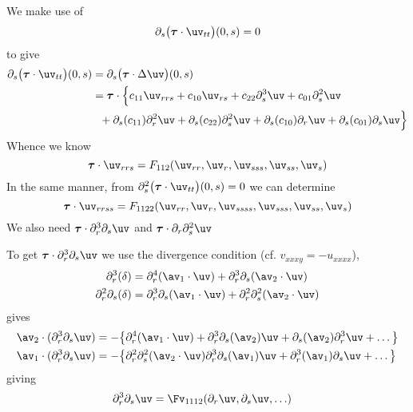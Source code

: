 We make use of 
\[
 \partial_s\big(\tauv\cdot\uv_{tt}\big)(0,s) = 0  
\]
to give
\begin{align*}
  \partial_s\big(\tauv\cdot\uv_{tt}\big)(0,s) &= \partial_s\big(\tauv\cdot\Delta\uv\big)(0,s) \\
     &= \tauv\cdot\Big\{ c_{11} \uv_{rrs} +  c_{10} \uv_{rs}  + c_{22}\partial_s^3\uv  + c_{01} \partial_s^2\uv  \\
     &~~+  \partial_s(c_{11})\partial_r^2\uv + \partial_s(c_{22})\partial_s^2\uv  + 
         \partial_s(c_{10})\partial_r\uv + \partial_s(c_{01}) \partial_s \uv \Big\}
\end{align*}
Whence we know
\begin{equation}
  \tauv\cdot\uv_{rrs} = F_{112}( \uv_{rr}, \uv_{r}, \uv_{sss}, \uv_{ss}, \uv_s) \label{eq:rrs}
\end{equation}
In the same manner, from $\partial_s^2\big(\tauv\cdot\uv_{tt}\big)(0,s) = 0 $
we can determine
 \begin{equation}
  \tauv\cdot\uv_{rrss} = F_{1122}( \uv_{rr}, \uv_{r}, \uv_{ssss}, \uv_{sss}, \uv_{ss}, \uv_s)  \label{eq:rrss}
\end{equation}
We also need $\tauv\cdot\partial_r^3\partial_s\uv$ and $\tauv\cdot\partial_r\partial_s^2\uv$

To get $\tauv\cdot\partial_r^3\partial_s\uv$ we use the divergence condition (cf. $v_{xxxy}=-u_{xxxx}$),
\begin{align*}
  \partial_r^3(\delta) &= \partial_r^4(\av_1\cdot\uv) +\partial_r^3\partial_s(\av_2\cdot\uv) \\
   \partial_r^2\partial_s(\delta) &= \partial_r^3\partial_s(\av_1\cdot\uv) +\partial_r^2\partial_s^2(\av_2\cdot\uv)
\end{align*}
gives
\begin{align*}
\av_2\cdot(\partial_r^3\partial_s\uv) &= -\big\{ \partial_r^4(\av_1\cdot\uv) +\partial_r^3\partial_s(\av_2)\uv
                         +\partial_s(\av_2)\partial_r^3\uv + \ldots \big\} \\
\av_1\cdot(\partial_r^3\partial_s\uv) &= -\big\{ \partial_r^2\partial_s^2(\av_2\cdot\uv)
               \partial_r^3\partial_s(\av_1)\uv + \partial_r^3 (\av_1)\partial_s\uv + \ldots    \big\}
\end{align*}
giving
\begin{align*}
\partial_r^3\partial_s\uv &= \Fv_{1112}(\partial_r\uv,\partial_s\uv, \ldots)
\end{align*}






